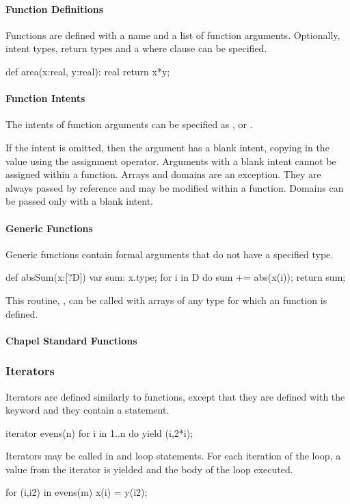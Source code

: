 \paragraph{Function Definitions}
Functions are defined with a name and a list of function
arguments.  Optionally, intent types, return types and a
where clause can be specified.
\begin{chapel}
def area(x:real, y:real): real {
  return x*y;
}
\end{chapel}

\paragraph{Function Intents}
The intents of function arguments can be specified as ,
 or .

If the intent is omitted, then the
argument has a blank intent, copying in the value using the assignment
operator.
Arguments with a blank intent cannot be assigned within a function.
Arrays and domains are an exception.  They are always passed by reference
and may be modified within a function.
Domains can be passed only with a blank intent.

\paragraph{Generic Functions}
Generic functions contain formal arguments that do not have
a specified type.
\begin{chapel}
def absSum(x:[?D]) {
  var sum: x.type;
  for i in D do sum += abs(x(i));
  return sum;
}
\end{chapel}
This routine, , can be called
with arrays of any type for which an  function is
defined.

\paragraph{Chapel Standard Functions}

\subsubsection{Iterators}
Iterators are defined similarly to functions, except that
they are defined with the keyword  and they
contain a  statement.
\begin{chapel}
iterator evens(n) {
  for i in 1..n do yield (i,2*i);
}
\end{chapel}
Iterators may be called in  and  loop
statements.  For each iteration of the loop, a value from the
iterator is yielded and the body of the loop executed.
\begin{chapel}
for (i,i2) in evens(m) {
  x(i) = y(i2);
}
\end{chapel}


